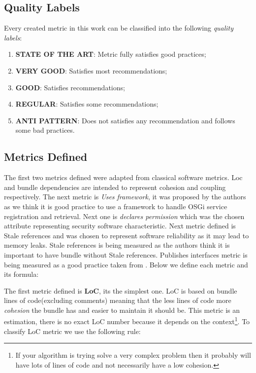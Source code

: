 \subsection{Quality Labels}
\label{sec:quality label}
Every created metric in this work can be classified into the following \emph{quality labels}:

\begin{enumerate}
\item \textbf{STATE OF THE ART}: Metric fully satisfies good practices;
\item \textbf{VERY GOOD}: Satisfies most recommendations;
\item \textbf{GOOD}: Satisfies recommendations;
\item \textbf{REGULAR}: Satisfies some recommendations;
\item \textbf{ANTI PATTERN}: Does not satisfies any recommendation and follows some bad practices.
\end{enumerate}


\subsection{Metrics Defined}
The first two metrics defined were adapted from classical software metrics. Loc and bundle dependencies are intended to represent cohesion and coupling respectively. The next metric is \emph{Uses framework}, it was proposed by the authors as we think it is good practice to use a framework to handle OSGi service registration and retrieval. Next one is \emph{declares permission} which was the chosen attribute representing security software characteristic. Next metric defined is Stale references and was chosen to represent software reliability as it may lead to memory leaks. Stale references is being measured as the authors think it is important to have bundle without Stale references. Publishes interfaces metric is being measured as a good practice taken from \citep{Knoernschild 2012}. Below we define each metric and its formula:  

The first metric defined is \textbf{LoC}, its the simplest one. LoC is based on bundle lines of code(excluding comments) meaning that the less lines of code more \emph{cohesion} the bundle has and easier to maintain it should be. This metric is an estimation, there is no exact LoC number because it depends on the context\footnote{If your algorithm is trying solve a very complex problem then it probably will have lots of lines of code and not necessarily have a low cohesion.}. To classify LoC metric we use the following rule:\newline


